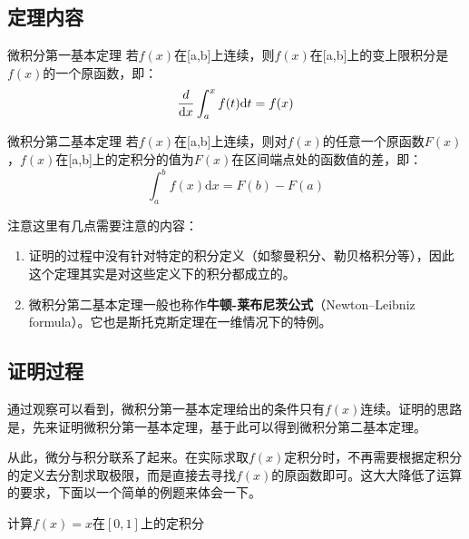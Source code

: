 \subsection{定理内容}

\begin{theorem}{微积分第一基本定理}
若$f(x)$在[a,b]上连续，则$f(x)$在[a,b]上的变上限积分是$f(x)$的一个原函数，即：
$${d\over\mathrm {d}x}\int_{a}^{x}f(t)\mathrm {d}t=f(x)$$
\end{theorem}

\begin{theorem}{微积分第二基本定理}
若$f(x)$在[a,b]上连续，则对$f(x)$的任意一个原函数$F(x)$，$f(x)$在[a,b]上的定积分的值为$F(x)$在区间端点处的函数值的差，即：
$$\int_{a}^{b} f(x)\mathrm {d}x=F(b)-F(a)$$
\end{theorem}

注意这里有几点需要注意的内容：
\begin{enumerate}
\item 证明的过程中没有针对特定的积分定义（如黎曼积分、勒贝格积分等），因此这个定理其实是对这些定义下的积分都成立的。
\item 微积分第二基本定理一般也称作\textbf{牛顿-莱布尼茨公式}（Newton–Leibniz formula）。它也是斯托克斯定理在一维情况下的特例。
\end{enumerate}

\subsection{证明过程}

通过观察可以看到，微积分第一基本定理给出的条件只有$f(x)$连续。证明的思路是，先来证明微积分第一基本定理，基于此可以得到微积分第二基本定理。



从此，微分与积分联系了起来。在实际求取$f(x)$定积分时，不再需要根据定积分的定义去分割求取极限，而是直接去寻找$f(x)$的原函数即可。这大大降低了运算的要求，下面以一个简单的例题来体会一下。
\begin{example}{}
计算$f(x)=x$在$[0,1]$上的定积分
\end{example}

